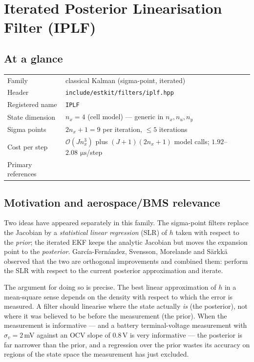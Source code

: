 \chapter{Iterated Posterior Linearisation Filter (IPLF)}
\label{ch:iplf}

\section*{At a glance}
\begin{tabular}{@{}l>{\raggedright\arraybackslash}p{}@{}}
Family & classical Kalman (sigma-point, iterated) \\
Header & \texttt{include/estkit/filters/iplf.hpp} \\
Registered name & \texttt{IPLF} \\
State dimension & $n_x = 4$ (cell model) --- generic in $n_x, n_u, n_y$ \\
Sigma points & $2n_x+1 = 9$ per iteration, $\le 5$ iterations \\
Cost per step & $\mathcal{O}(J n_x^3)$ plus $(J{+}1)(2n_x{+}1)$ model calls; $1.92$--$2.08\,\SI{}{\micro\second}$/step \\
Primary references & \cite{garciafernandez2015iplf,garciafernandez2017ipls,julier2000newmethod,bellcathey1993} \\
\end{tabular}

\section{Motivation and aerospace/BMS relevance}
Two ideas have appeared separately in this family. The sigma-point filters replace the
Jacobian by a \emph{statistical linear regression} (SLR) of $h$ taken with respect to the
\emph{prior}; the iterated EKF keeps the analytic Jacobian but moves the expansion point to
the \emph{posterior}. García-Fernández, Svensson, Morelande and
Särkkä~\cite{garciafernandez2015iplf} observed that the two are orthogonal improvements and
combined them: perform the SLR with respect to the current posterior approximation and
iterate.

The argument for doing so is precise. The best linear approximation of $h$ in a mean-square
sense depends on the density with respect to which the error is measured. A filter should
linearise where the state actually \emph{is} (the posterior), not where it was believed to be
before the measurement (the prior). When the measurement is informative --- and a battery
terminal-voltage measurement with $\sigma_v = 2$\,mV against an OCV slope of $0.8$\,V is very
informative --- the posterior is far narrower than the prior, and a regression over the
prior wastes its accuracy on regions of the state space the measurement has just excluded.

